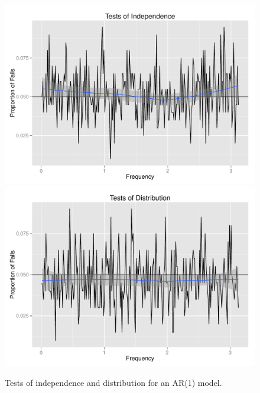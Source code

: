 \documentclass{article}\usepackage{graphicx, color}
\newenvironment{knitrout}{}{} %
\theoremstyle{plain}
\begin{document}
\begin{knitrout}
\color{fgcolor}\begin{figure}[H]

\includegraphics[width=.49\textwidth]{figure/tests-ar11} 
\includegraphics[width=.49\textwidth]{figure/tests-ar12} \caption[Tests of independence and distribution for an AR(1) model]{Tests of independence and distribution for an AR(1) model.\label{fig:tests-ar1}}
\end{figure}


\end{knitrout}
\end{document}
